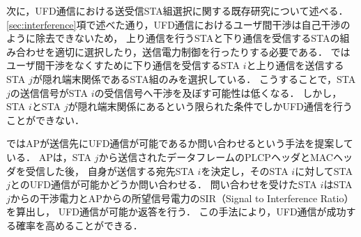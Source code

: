 \documentclass[master]{kuisthesis}		%
\begin{document}
			\par
			次に，UFD通信における送受信STA組選択に関する既存研究について述べる．
			\ref{sec:interference}項で述べた通り，UFD通信におけるユーザ間干渉は自己干渉のように除去できないため，
			上り通信を行うSTAと下り通信を受信するSTAの組み合わせを適切に選択したり，送信電力制御を行ったりする必要である．
			\cite{fdmac3}ではユーザ間干渉をなくすために下り通信を受信するSTA $i$と上り通信を送信するSTA $j$が隠れ端末関係であるSTA組のみを選択している．
			こうすることで，STA $j$の送信信号がSTA $i$の受信信号へ干渉を及ぼす可能性は低くなる．
			しかし，STA $i$とSTA $j$が隠れ端末関係にあるという限られた条件でしかUFD通信を行うことができない．
			\par
			\cite{goyal}ではAPが送信先にUFD通信が可能であるか問い合わせるという手法を提案している．
			APは，STA $j$から送信されたデータフレームのPLCPヘッダとMACヘッダを受信した後，
			自身が送信する宛先STA $i$を決定し，そのSTA $i$に対してSTA $j$とのUFD通信が可能かどうか問い合わせる．
			問い合わせを受けたSTA $i$はSTA $j$からの干渉電力とAPからの所望信号電力のSIR（Signal to Interference Ratio）を算出し，
			UFD通信が可能か返答を行う．
			この手法により，UFD通信が成功する確率を高めることができる．
\end{document}
